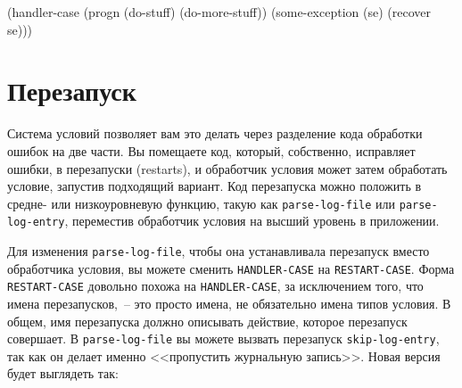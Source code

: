 \begin{lrbox}{\choneninethree}
  \begin{minipage}{\linewidth}
\begin{myverb}
(handler-case
    (progn
      (do-stuff)
      (do-more-stuff))
  (some-exception (se) (recover se)))
\end{myverb} 
  \end{minipage}
\end{lrbox}




\section{Перезапуск}

Система условий позволяет вам это делать через разделение кода обработки ошибок на две
части. Вы помещаете код, который, собственно, исправляет ошибки, в перезапуски (restarts), и
обработчик условия может затем обработать условие, запустив подходящий вариант. Код
перезапуска можно положить в средне- или низкоуровневую функцию, такую как
\lstinline{parse-log-file} или \lstinline{parse-log-entry}, переместив обработчик условия на высший
уровень в приложении.

Для изменения \lstinline{parse-log-file}, чтобы она устанавливала перезапуск вместо обработчика
условия, вы можете сменить \lstinline{HANDLER-CASE} на \lstinline{RESTART-CASE}. Форма
\lstinline{RESTART-CASE} довольно похожа на \lstinline{HANDLER-CASE}, за исключением того, что имена
перезапусков,~-- это просто имена, не обязательно имена типов условия. В общем, имя
перезапуска должно описывать действие, которое перезапуск совершает. В
\lstinline{parse-log-file} вы можете вызвать перезапуск \lstinline{skip-log-entry}, так как он делает
именно <<пропустить журнальную запись>>. Новая версия будет выглядеть так:

